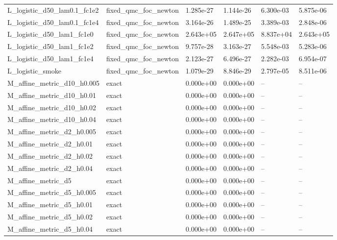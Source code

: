 \begin{tabular}{llllll}
L\_logistic\_d50\_lam0.1\_fc1e2 & fixed\_qmc\_foc\_newton & 1.285e-27 & 1.144e-26 & 6.300e-03 & 5.875e-06 \\
L\_logistic\_d50\_lam0.1\_fc1e4 & fixed\_qmc\_foc\_newton & 3.164e-26 & 1.489e-25 & 3.389e-03 & 2.848e-06 \\
L\_logistic\_d50\_lam1\_fc1e0 & fixed\_qmc\_foc\_newton & 2.643e+05 & 2.647e+05 & 8.837e+04 & 2.643e+05 \\
L\_logistic\_d50\_lam1\_fc1e2 & fixed\_qmc\_foc\_newton & 9.757e-28 & 3.163e-27 & 5.548e-03 & 5.283e-06 \\
L\_logistic\_d50\_lam1\_fc1e4 & fixed\_qmc\_foc\_newton & 2.123e-27 & 6.496e-27 & 2.282e-03 & 6.954e-07 \\
L\_logistic\_smoke & fixed\_qmc\_foc\_newton & 1.079e-29 & 8.846e-29 & 2.797e-05 & 8.511e-06 \\
M\_affine\_metric\_d10\_h0.005 & exact & 0.000e+00 & 0.000e+00 & -- & -- \\
M\_affine\_metric\_d10\_h0.01 & exact & 0.000e+00 & 0.000e+00 & -- & -- \\
M\_affine\_metric\_d10\_h0.02 & exact & 0.000e+00 & 0.000e+00 & -- & -- \\
M\_affine\_metric\_d10\_h0.04 & exact & 0.000e+00 & 0.000e+00 & -- & -- \\
M\_affine\_metric\_d2\_h0.005 & exact & 0.000e+00 & 0.000e+00 & -- & -- \\
M\_affine\_metric\_d2\_h0.01 & exact & 0.000e+00 & 0.000e+00 & -- & -- \\
M\_affine\_metric\_d2\_h0.02 & exact & 0.000e+00 & 0.000e+00 & -- & -- \\
M\_affine\_metric\_d2\_h0.04 & exact & 0.000e+00 & 0.000e+00 & -- & -- \\
M\_affine\_metric\_d5 & exact & 0.000e+00 & 0.000e+00 & -- & -- \\
M\_affine\_metric\_d5\_h0.005 & exact & 0.000e+00 & 0.000e+00 & -- & -- \\
M\_affine\_metric\_d5\_h0.01 & exact & 0.000e+00 & 0.000e+00 & -- & -- \\
M\_affine\_metric\_d5\_h0.02 & exact & 0.000e+00 & 0.000e+00 & -- & -- \\
M\_affine\_metric\_d5\_h0.04 & exact & 0.000e+00 & 0.000e+00 & -- & -- \\
\bottomrule
\end{tabular}
